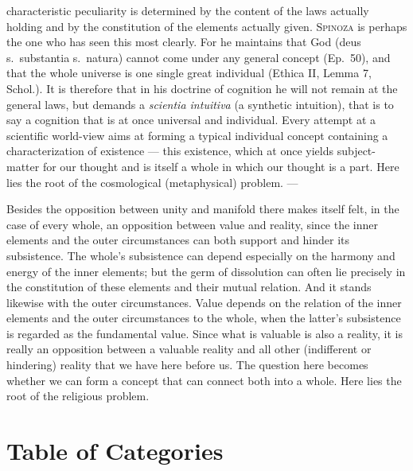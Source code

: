 \documentclass[12pt]{book}
\newcommand{\opage}[1]{\marginnote{\footnotesize\textit{[#1]}}}
\begin{document}
characteristic peculiarity is determined by the content of the laws actually holding and by the
constitution of the elements actually given. \textsc{Spinoza} is perhaps the one who has seen
this most clearly. For he maintains that God (deus s.\ substantia s.\ natura) cannot come under
any general concept (Ep.\ 50), and that the whole universe is one single great individual
(Ethica II, Lemma 7, Schol.). It is therefore that in his doctrine of cognition he will not
remain at the general laws, but demands a \textit{scientia intuitiva} (a synthetic intuition),
that is to say a cognition that is at once universal and individual. Every attempt at a
scientific world-view aims at forming a typical individual concept containing a characterization
of existence --- this existence, which at once yields subject-matter for our thought and is
itself a whole in which our thought is a part. Here lies the root of the cosmological
(metaphysical) problem. ---

Besides the opposition between unity and manifold there makes itself felt, in the case of every
whole, an opposition between value and reality, \opage{78}since the inner elements and the outer
circumstances can both support and hinder its subsistence. The whole's subsistence can depend
especially on the harmony and energy of the inner elements; but the germ of dissolution can
often lie precisely in the constitution of these elements and their mutual relation. And it
stands likewise with the outer circumstances. Value depends on the relation of the inner
elements and the outer circumstances to the whole, when the latter's subsistence is regarded as
the fundamental value. Since what is valuable is also a reality, it is really an opposition
between a valuable reality and all other (indifferent or hindering) reality that we have here
before us. The question here becomes whether we can form a concept that can connect both into a
whole. Here lies the root of the religious problem.



\chapter*{Table of Categories}
\opage{79}%
\end{document}
